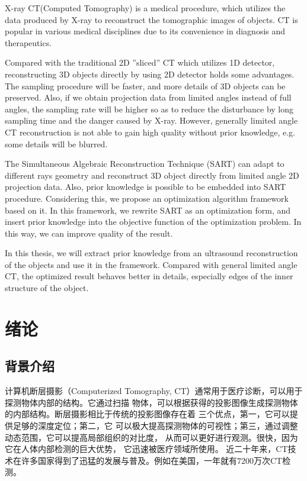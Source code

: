 \begin{englishabstract}
X-ray CT(Computed Tomography) is a medical procedure, which utilizes the data produced by X-ray to reconstruct
the tomographic images of objects. CT is popular in various medical disciplines due to its convenience in
diagnosis and therapeutics.

Compared with the traditional 2D
''sliced'' CT which utilizes 1D detector, reconstructing 3D objects directly by using 2D detector holds some advantages.
The sampling procedure will be faster, and more details of 3D objects can be preserved.  Also, if we obtain
projection data from limited angles instead of full angles, the sampling rate will be higher so as to reduce the disturbance by
long sampling time and the danger caused by X-ray. However, generally limited angle CT reconstruction is not able to gain high
quality without prior knowledge, e.g. some details will be blurred.

The Simultaneous Algebraic Reconstruction Technique (SART)
can adapt to different rays geometry and reconstruct 3D object directly
from limited angle 2D projection data. Also, prior knowledge is possible to be embedded into SART procedure. Considering this,
we propose an optimization algorithm framework based on it. In this framework, we rewrite SART as an optimization form, and
insert prior knowledge into the objective function of the optimization problem. In this way, we can improve quality of the result.

In this thesis, we will extract prior knowledge from an ultrasound reconstruction of the objects and use it
in the framework. Compared with general limited angle CT, the optimized result behaves better in details, especially edges of the inner structure
of the object.

\end{englishabstract}
\NJUTtableofcontents
\mainmatter

\songti{}
\chapter{绪论}
\section{背景介绍}
计算机断层摄影（Computerized Tomography, CT）通常用于医疗诊断，可以用于探测物体内部的结构。它通过扫描
物体，可以根据获得的投影图像生成探测物体的内部结构。断层摄影相比于传统的投影图像存在着
三个优点，第一，它可以提供足够的深度定位；第二，它
可以极大提高探测物体的可视性；第三，通过调整动态范围，它可以提高局部组织的对比度，
从而可以更好进行观测。很快，因为它在人体内部检测的巨大优势，
它迅速被医疗领域所使用\cite{dobbins2003digital}。
近二十年来，CT技术在许多国家得到了迅猛的发展与普及。例如在美国，一年就有$7200$万次CT检测\cite{berrington2009projected}。

